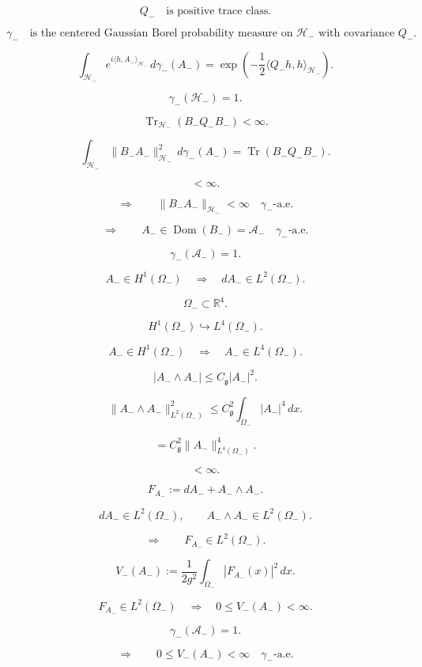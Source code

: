 \documentclass[11pt]{article}
\begin{document}
\[
Q_-
\quad
\text{is positive trace class}.
\]

\[
\gamma_-
\quad
\text{is the centered Gaussian Borel probability measure on }\mathcal H_-
\text{ with covariance }Q_-.
\]

\[
\int_{\mathcal H_-}e^{i\langle h,A_-\rangle_{\mathcal H_-}}\,d\gamma_-(A_-)
=
\exp\left(
-\frac12\langle Q_-h,h\rangle_{\mathcal H_-}
\right).
\]

\[
\gamma_-(\mathcal H_-)=1.
\]

\[
\operatorname{Tr}_{\mathcal H_-}
\left(
B_-Q_-B_-
\right)
<\infty.
\]

\[
\int_{\mathcal H_-}\|B_-A_-\|_{\mathcal H_-}^2\,d\gamma_-(A_-)
=
\operatorname{Tr}(B_-Q_-B_-).
\]

\[
<\infty.
\]

\[
\Longrightarrow
\qquad
\|B_-A_-\|_{\mathcal H_-}<\infty
\quad
\gamma_-\text{-a.e.}
\]

\[
\Longrightarrow
\qquad
A_-\in\operatorname{Dom}(B_-)=\mathcal A_-
\quad
\gamma_-\text{-a.e.}
\]

\[
\boxed{
\gamma_-(\mathcal A_-)=1.
}
\]

\[
A_-\in H^1(\Omega_-)
\quad
\Longrightarrow
\quad
dA_-\in L^2(\Omega_-).
\]

\[
\Omega_-\subset\mathbb R^4.
\]

\[
H^1(\Omega_-)\hookrightarrow L^4(\Omega_-).
\]

\[
A_-\in H^1(\Omega_-)
\quad
\Longrightarrow
\quad
A_-\in L^4(\Omega_-).
\]

\[
|A_-\wedge A_-|
\le
C_{\mathfrak g}|A_-|^2.
\]

\[
\|A_-\wedge A_-\|_{L^2(\Omega_-)}^2
\le
C_{\mathfrak g}^2
\int_{\Omega_-}|A_-|^4\,dx.
\]

\[
=
C_{\mathfrak g}^2
\|A_-\|_{L^4(\Omega_-)}^4.
\]

\[
<\infty.
\]

\[
F_{A_-}
:=
dA_-+A_-\wedge A_-.
\]

\[
dA_-\in L^2(\Omega_-),
\qquad
A_-\wedge A_-\in L^2(\Omega_-).
\]

\[
\Longrightarrow
\qquad
F_{A_-}\in L^2(\Omega_-).
\]

\[
V_-(A_-)
:=
\frac{1}{2g^2}
\int_{\Omega_-}|F_{A_-}(x)|^2\,dx.
\]

\[
F_{A_-}\in L^2(\Omega_-)
\quad
\Longrightarrow
\quad
0\le V_-(A_-)<\infty.
\]

\[
\gamma_-(\mathcal A_-)=1.
\]

\[
\Longrightarrow
\qquad
0\le V_-(A_-)<\infty
\quad
\gamma_-\text{-a.e.}
\]
\end{document}
